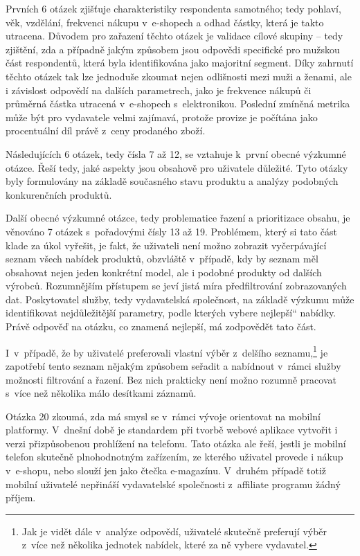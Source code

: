 \documentclass[12pt,oneside,openany]{fithesis}
\begin{document}
Prvních 6 otázek 
zjišťuje charakteristiky respondenta samotného; tedy pohlaví, věk, 
vzdělání, frekvenci nákupu v~e-shopech a odhad částky, která je takto 
utracena. Důvodem pro zařazení těchto otázek je validace cílové skupiny 
-- tedy zjištění, zda a případně jakým způsobem jsou odpovědi 
specifické pro mužskou část respondentů, která byla identifikována jako 
majoritní segment. Díky zahrnutí těchto otázek tak lze jednoduše zkoumat 
nejen odlišnosti mezi muži a ženami, ale i závislost odpovědí na dalších 
parametrech, jako je frekvence nákupů či průměrná částka utracená 
v~e-shopech s~elektronikou. Poslední zmíněná metrika může být pro 
vydavatele velmi zajímavá, protože provize je počítána jako 
procentuální díl právě z~ceny prodaného zboží.

Následujících 6 otázek, tedy čísla 7 až 12, se vztahuje k~první obecné 
výzkumné otázce. Řeší tedy, jaké aspekty jsou obsahově pro uživatele 
důležité. Tyto otázky byly formulovány na základě současného stavu 
produktu a analýzy podobných konkurenčních produktů.

Další obecné výzkumné otázce, tedy problematice řazení a prioritizace obsahu, 
je věnováno 7 otázek s~pořadovými čísly 13 až 19. Problémem, který si 
tato část klade za úkol vyřešit, je fakt, že uživateli není možno 
zobrazit vyčerpávající seznam všech nabídek produktů, obzvláště 
v~případě, kdy by seznam měl obsahovat nejen jeden konkrétní model, ale i 
podobné produkty od dalších výrobců. Rozumnějším přístupem se jeví 
jistá míra předfiltrování zobrazovaných dat. Poskytovatel služby, tedy 
vydavatelská společnost, na základě výzkumu může identifikovat 
nejdůležitější parametry, podle kterých vybere \glqq 
nejlepší\textquotedblleft{} nabídky. Právě odpověď na otázku, co 
znamená nejlepší, má zodpovědět tato část.

I~v~případě, že by uživatelé preferovali vlastní výběr z~delšího 
seznamu,\footnote{
    Jak je vidět dále v~analýze odpovědí, uživatelé skutečně 
preferují výběr z~více než několika jednotek nabídek, které za ně 
vybere vydavatel.
} je zapotřebí tento
seznam nějakým způsobem seřadit a nabídnout v~rámci služby možnosti 
filtrování a řazení. Bez nich prakticky není možno rozumně pracovat 
s~více než několika málo desítkami záznamů.

Otázka 20 zkoumá, zda má smysl se v~rámci vývoje orientovat na mobilní 
platformy. V~dnešní době je standardem při tvorbě webové aplikace 
vytvořit i verzi přizpůsobenou prohlížení na telefonu. Tato otázka ale 
řeší, jestli je mobilní telefon skutečně plnohodnotným zařízením, ze 
kterého uživatel provede i nákup v~e-shopu, nebo slouží jen jako čtečka 
e-magazínu. V~druhém případě totiž mobilní uživatelé nepřináší 
vydavatelské společnosti z~affiliate programu žádný příjem.
\end{document}
